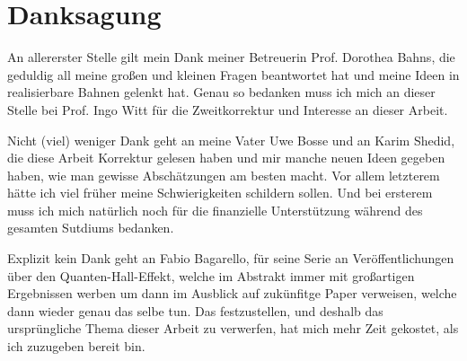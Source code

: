
\chapter{Danksagung}
\label{chap:danksagung}

An allererster Stelle gilt mein Dank meiner Betreuerin Prof. Dorothea Bahns, die geduldig all meine großen und kleinen Fragen beantwortet hat und meine Ideen in realisierbare Bahnen gelenkt hat. Genau so bedanken muss ich mich an dieser Stelle bei Prof. Ingo Witt für die Zweitkorrektur und Interesse an dieser Arbeit.

Nicht (viel) weniger Dank geht an meine Vater Uwe Bosse und an Karim Shedid, die diese Arbeit Korrektur gelesen haben und mir manche neuen Ideen gegeben haben, wie man gewisse Abschätzungen am besten macht. Vor allem letzterem hätte ich viel früher meine Schwierigkeiten schildern sollen. Und bei ersterem muss ich mich natürlich noch für die finanzielle Unterstützung während des gesamten Sutdiums bedanken.

Explizit kein Dank geht an Fabio Bagarello, für seine Serie an Veröffentlichungen über den Quanten-Hall-Effekt, welche im Abstrakt immer mit großartigen Ergebnissen werben um dann im Ausblick auf zukünfitge Paper verweisen, welche dann wieder genau das selbe tun. Das festzustellen, und deshalb das ursprüngliche Thema dieser Arbeit zu verwerfen, hat mich mehr Zeit gekostet, als ich zuzugeben bereit bin.
